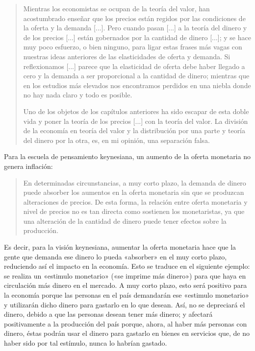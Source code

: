 \documentclass[12pt,a4paper,twoside]{book}
\begin{document}
\begin{quotation}
Mientras los economistas se ocupan de la teoría del valor, han acostumbrado enseñar que los precios están regidos por las condiciones de la oferta y la demanda [...]. Pero cuando pasan [...] a la teoría del dinero y de los precios [...] están gobernados por la cantidad de dinero [...]; y se hace muy poco esfuerzo, o bien ninguno, para ligar estas frases más vagas con nuestras ideas anteriores de las elasticidades de oferta y demanda. Si reflexionamos [...] parece que la elasticidad de oferta debe haber llegado a cero y la demanda a ser proporcional a la cantidad de dinero; mientras que en los estudios más elevados nos encontramos perdidos en una niebla donde no hay nada claro y todo es posible.

Uno de los objetos de los capítulos anteriores ha sido escapar de esta doble vida y poner la teoría de los precios [...] con la teoría del valor. La división de la economía en teoría del valor y la distribución por una parte y teoría del dinero por la otra, es, en mi opinión, una separación falsa. \cite[pág. 160]{keynes}
\end{quotation}

Para la escuela de pensamiento keynesiana, un aumento de la oferta monetaria no genera inflación:

\begin{quotation}
En determinadas circunstancias, a muy corto plazo, la demanda de dinero puede absorber los aumentos en la oferta monetaria sin que se produzcan alteraciones de precios. De esta forma, la relación entre oferta monetaria y nivel de precios no es tan directa como sostienen los monetaristas, ya que una alteración de la cantidad de dinero puede tener efectos sobre la producción. \cite[pág. 300]{mochobeker}
\end{quotation}

Es decir, para la visión keynesiana, aumentar la oferta monetaria hace que la gente que demanda ese dinero lo pueda «absorber» en el muy corto plazo, reduciendo así el impacto en la economía. Esto se traduce en el siguiente ejemplo: se realiza un «estimulo monetario» («se imprime más dinero») para que haya en circulación más dinero en el mercado. A muy corto plazo, esto será positivo para la economía porque las personas en el país demandarán ese «estimulo monetario» y utilizarán dicho dinero para gastarlo en lo que desean. Así, no se depreciará el dinero, debido a que las personas desean tener más dinero; y afectará positivamente a la producción del país porque, ahora, al haber más personas con dinero, éstas podrán usar el dinero para gastarlo en bienes en servicios que, de no haber sido por tal estímulo, nunca lo habrían gastado.
\end{document}
